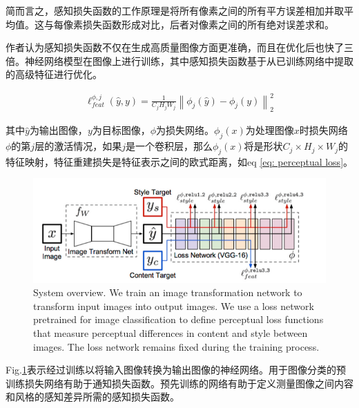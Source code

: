 \documentclass[letterpaper,12pt]{article}
\begin{document}
			简而言之，感知损失函数的工作原理是将所有像素之间的所有平方误差相加并取平均值。这与每像素损失函数形成对比，后者对像素之间的所有绝对误差求和\cite{johnson2016perceptual}。
			
			作者认为感知损失函数不仅在生成高质量图像方面更准确，而且在优化后也快了三倍。神经网络模型在图像上进行训练，其中感知损失函数基于从已训练网络中提取的高级特征进行优化。
			
			\begin{equation}
				\begin{aligned}
					\ell_{feat}^{\phi,j} (\hat{y},y) = \frac{1}{C_{j}H_{j}W_{j}}{\left\| \phi_{j}(\hat{y})-\phi_{j}(y)\right\|}_{2}^2
				\end{aligned}
				\label{eq: perceptual loss}
			\end{equation}
			
			其中$\hat{y}$为输出图像，$y$为目标图像，$\phi$为损失网络。$\phi_{j}(x)$为处理图像$x$时损失网络$\phi$的第$j$层的激活情况，如果$j$是一个卷积层，那么$\phi_{j}(x)$将是形状$C_{j} \times H_{j} \times W_{j}$的特征映射，特征重建损失是特征表示之间的欧式距离，如eq \ref{eq: perceptual loss}。
			
			\begin{figure}[ht] 
				\centering \includegraphics[width=0.8\columnwidth]{perceptual}
				\captionsetup{font=scriptsize}
				\caption{
					\label{fig: perceptual loss} %
					System overview. We train an image transformation network to transform input images into output images. We use a loss network pretrained for image classification to define perceptual loss functions that measure perceptual differences in content and style between images. The loss network remains fixed during the training process.
				}
			\end{figure}
			
			Fig.\ref{fig: perceptual loss}表示经过训练以将输入图像转换为输出图像的神经网络。用于图像分类的预训练损失网络有助于通知损失函数。预先训练的网络有助于定义测量图像之间内容和风格的感知差异所需的感知损失函数。
			
\end{document}

